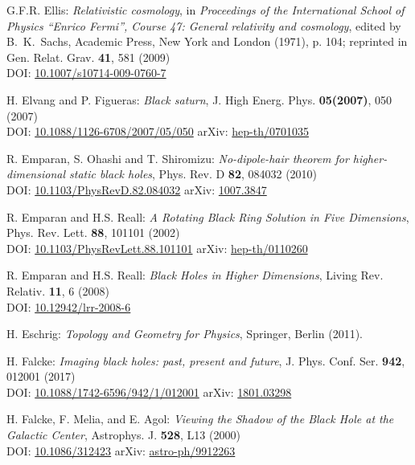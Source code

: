 \begin{thebibliography}{123}
G.F.R. Ellis:
{\em Relativistic cosmology},
in  {\em Proceedings of the International School of Physics ``Enrico Fermi'',
Course 47: General relativity and cosmology}, edited by B.~K.~Sachs,
Academic Press, New York and London (1971), p. 104;
reprinted in Gen. Relat. Grav. {\bf 41}, 581 (2009)\\
DOI: \href{https://doi.org/10.1007/s10714-009-0760-7}{10.1007/s10714-009-0760-7}

H. Elvang and P. Figueras:
{\em Black saturn},
J. High Energ. Phys. {\bf 05(2007)}, 050 (2007)\\
DOI: \href{https://doi.org/10.1088/1126-6708/2007/05/050}{10.1088/1126-6708/2007/05/050}\hfill
arXiv: \href{https://arxiv.org/abs/hep-th/0701035}{hep-th/0701035}

R. Emparan, S. Ohashi and T. Shiromizu:
{\em No-dipole-hair theorem for higher-dimensional static black holes},
Phys. Rev. D {\bf 82}, 084032 (2010)\\
DOI: \href{https://doi.org/10.1103/PhysRevD.82.084032}{10.1103/PhysRevD.82.084032}\hfill
arXiv: \href{https://arxiv.org/abs/1007.3847}{1007.3847}

R. Emparan and H.S. Reall:
{\em A Rotating Black Ring Solution in Five Dimensions},
Phys. Rev. Lett. {\bf 88}, 101101 (2002)\\
DOI: \href{https://doi.org/10.1103/PhysRevLett.88.101101}{10.1103/PhysRevLett.88.101101}\hfill
arXiv: \href{https://arxiv.org/abs/hep-th/0110260}{hep-th/0110260}

R. Emparan and H.S. Reall:
{\em Black Holes in Higher Dimensions},
Living Rev. Relativ. {\bf 11}, 6 (2008)\\
DOI: \href{https://doi.org/10.12942/lrr-2008-6}{10.12942/lrr-2008-6}

H. Eschrig: {\em Topology and Geometry for Physics},
Springer, Berlin (2011).

H. Falcke:
{\em Imaging black holes: past, present and future},
J. Phys. Conf. Ser. {\bf 942}, 012001 (2017)\\
DOI: \href{https://doi.org/10.1088/1742-6596/942/1/012001}{10.1088/1742-6596/942/1/012001}\hfill
arXiv: \href{https://arxiv.org/abs/1801.03298}{1801.03298}

H. Falcke, F. Melia, and E. Agol:
{\em Viewing the Shadow of the Black Hole at the Galactic Center},
Astrophys. J. {\bf 528}, L13 (2000)\\
DOI: \href{https://doi.org/10.1086/312423}{10.1086/312423}\hfill
arXiv: \href{https://arxiv.org/abs/astro-ph/9912263}{astro-ph/9912263}


\end{thebibliography}
